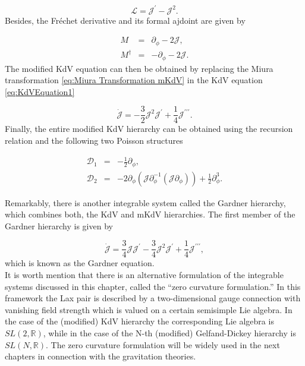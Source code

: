 \documentclass[letterpaper,11pt,oneside]{book}
\begin{document}
\begin{equation}
	\mathcal{L}=\mathcal{J}^{\prime}-\mathcal{J}^{2}.\label{eq:Miura Transformation mKdV}
\end{equation}
Besides, the Fréchet derivative and its formal ajdoint are given by

\begin{eqnarray*}
	M & = & \partial_{\phi}-2\mathcal{J},\\
	M^{\dagger} & = & -\partial_{\phi}-2\mathcal{J}.
\end{eqnarray*}
The modified KdV equation can then be obtained by replacing the
Miura transformation \eqref{eq:Miura Transformation mKdV} in the
KdV equation \eqref{eq:KdVEquation1}

\begin{equation}
	\dot{\mathcal{J}}=-\frac{3}{2}\mathcal{J}^{2}\mathcal{J}^{\prime}+\frac{1}{4}\mathcal{J}^{\prime\prime\prime}.\label{eq:mKdVEquation1}
\end{equation}
Finally, the entire modified KdV hierarchy can be obtained using the recursion relation and the following two Poisson structures

\begin{eqnarray}
	\mathscr{D}_{1} & = & -\frac{1}{2}\partial_{\phi},\label{eq:D1mKdV}\\
	\mathscr{D}_{2} & = & -2\partial_{\phi}\left(\mathcal{J}\partial_{\phi}^{-1}\left(\mathcal{J}\partial_{\phi}\right)\right)+\frac{1}{2}\partial_{\phi}^{3}.\label{eq:D2mKdV}
\end{eqnarray}

Remarkably, there is another integrable system called the Gardner hierarchy, which combines both, the KdV and mKdV hierarchies. The first member of the Gardner hierarchy is given by

\begin{equation}
	\dot{\mathcal{J}}= \frac{3}{4}\mathcal{J}\mathcal{J}^{\prime}-\frac{3}{4}\mathcal{J}^{2}\mathcal{J}^{\prime}+\frac{1}{4}\mathcal{J}^{\prime\prime\prime},\label{eq:GardnerEquation1}
\end{equation}
which is known as the Gardner equation. \\


It is worth mention that there is an alternative formulation of the integrable systems discussed in this chapter, called the ``zero curvature formulation.'' In this framework the Lax pair is described by a two-dimensional gauge connection with vanishing field strength which is valued on a certain semisimple Lie algebra. In the case of the (modified) KdV hierarchy the corresponding Lie algebra is $SL(2,\mathbb{R})$, while in the case of the N-th (modified) Gelfand-Dickey hierarchy is $SL(N,\mathbb{R})$. The zero curvature formulation will be widely used in the next chapters in connection with the gravitation theories.
\end{document}
